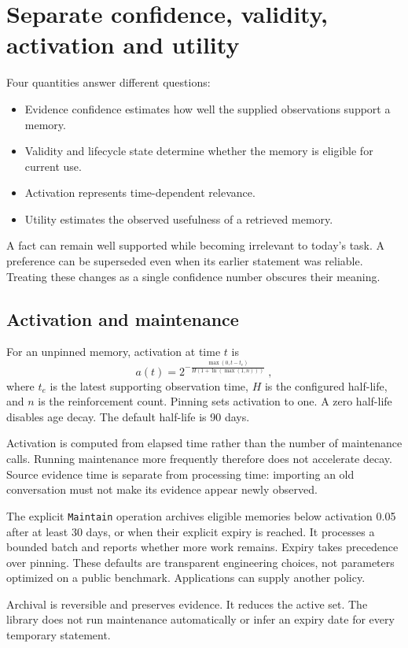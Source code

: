 \documentclass[11pt]{article}
\begin{document}
\section{Separate confidence, validity, activation and utility}
Four quantities answer different questions:
\begin{itemize}
\item Evidence confidence estimates how well the supplied observations support a memory.
\item Validity and lifecycle state determine whether the memory is eligible for current use.
\item Activation represents time-dependent relevance.
\item Utility estimates the observed usefulness of a retrieved memory.
\end{itemize}
A fact can remain well supported while becoming irrelevant to today's task. A preference can be superseded even when its earlier statement was reliable. Treating these changes as a single confidence number obscures their meaning.

\subsection{Activation and maintenance}
For an unpinned memory, activation at time $t$ is
\[
a(t)=2^{-\frac{\max(0,t-t_e)}
{H(1+\ln(\max(1,n)))}}\;,
\]
where $t_e$ is the latest supporting observation time, $H$ is the configured half-life, and $n$ is the reinforcement count. Pinning sets activation to one. A zero half-life disables age decay. The default half-life is 90 days.

Activation is computed from elapsed time rather than the number of maintenance calls. Running maintenance more frequently therefore does not accelerate decay. Source evidence time is separate from processing time: importing an old conversation must not make its evidence appear newly observed.

The explicit \texttt{Maintain} operation archives eligible memories below activation 0.05 after at least 30 days, or when their explicit expiry is reached. It processes a bounded batch and reports whether more work remains. Expiry takes precedence over pinning. These defaults are transparent engineering choices, not parameters optimized on a public benchmark. Applications can supply another policy.

Archival is reversible and preserves evidence. It reduces the active set. The library does not run maintenance automatically or infer an expiry date for every temporary statement.
\end{document}
